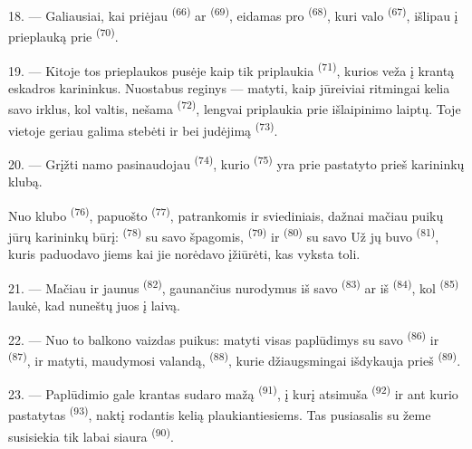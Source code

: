 18. --- Galiausiai, kai priėjau  \textsuperscript{(66)} ar
 \textsuperscript{(69)}, eidamas pro 
\textsuperscript{(68)}, kuri valo  \textsuperscript{(67)}, išlipau į
prieplauką prie  \textsuperscript{(70)}.

19. --- Kitoje tos prieplaukos pusėje kaip tik priplaukia 
\textsuperscript{(71)}, kurios veža į krantą eskadros karininkus. Nuostabus reginys ---
matyti, kaip jūreiviai ritmingai kelia savo irklus, kol valtis, nešama 
\textsuperscript{(72)}, lengvai priplaukia prie išlaipinimo laiptų. Toje vietoje
geriau galima stebėti  ir  bei
 judėjimą  \textsuperscript{(73)}.

\VUsaut{3.0mm}
\VUsaut{3.0mm}

20. --- Grįžti namo pasinaudojau 
\textsuperscript{(74)}, kurio  \textsuperscript{(75)} yra prie
 pastatyto prieš karininkų klubą.

Nuo klubo  \textsuperscript{(76)}, papuošto 
\textsuperscript{(77)}, patrankomis ir sviediniais, dažnai mačiau puikų jūrų
karininkų būrį:  \textsuperscript{(78)} su savo špagomis,
 \textsuperscript{(79)} ir 
\textsuperscript{(80)}  su savo  Už jų buvo
 \textsuperscript{(81)}, kuris paduodavo jiems  kai
jie norėdavo įžiūrėti, kas vyksta toli.

21. --- Mačiau ir jaunus  \textsuperscript{(82)},
gaunančius nurodymus iš savo  \textsuperscript{(83)} ar iš
 \textsuperscript{(84)}, kol 
\textsuperscript{(85)} laukė, kad nuneštų juos į laivą.

22. --- Nuo to balkono vaizdas puikus: matyti visas paplūdimys su savo
 \textsuperscript{(86)} ir 
\textsuperscript{(87)}, ir matyti, maudymosi valandą, 
\textsuperscript{(88)}, kurie džiaugsmingai išdykauja prieš 
\textsuperscript{(89)}.

23. --- Paplūdimio gale krantas sudaro mažą  
\textsuperscript{(91)}, į kurį atsimuša  \textsuperscript{(92)}
ir ant kurio pastatytas  \textsuperscript{(93)}, naktį rodantis kelią
plaukiantiesiems. Tas pusiasalis su žeme susisiekia tik labai siaura 
\textsuperscript{(90)}.

